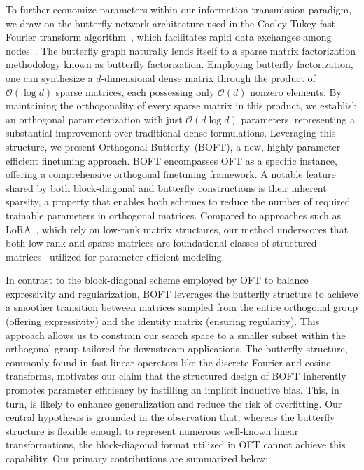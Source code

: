 To further economize parameters within our information transmission paradigm, we draw on the butterfly network architecture used in the Cooley-Tukey fast Fourier transform algorithm~\cite{cooley1965algorithm}, which facilitates rapid data exchanges among nodes~\cite{klasing1994broadcasting}. The butterfly graph naturally lends itself to a sparse matrix factorization methodology known as butterfly factorization. Employing butterfly factorization, one can synthesize a $d$-dimensional dense matrix through the product of $\mathcal{O}(\log d)$ sparse matrices, each possessing only $\mathcal{O}(d)$ nonzero elements. By maintaining the orthogonality of every sparse matrix in this product, we establish an orthogonal parameterization with just $\mathcal{O}(d\log d)$ parameters, representing a substantial improvement over traditional dense formulations. Leveraging this structure, we present Orthogonal Butterfly~(BOFT), a new, highly parameter-efficient finetuning approach. BOFT encompasses OFT as a specific instance, offering a comprehensive orthogonal finetuning framework. A notable feature shared by both block-diagonal and butterfly constructions is their inherent sparsity, a property that enables both schemes to reduce the number of required trainable parameters in orthogonal matrices. Compared to approaches such as LoRA~\cite{hulora2022}, which rely on low-rank matrix structures, our method underscores that both low-rank and sparse matrices are foundational classes of structured matrices~\cite{candes2011robust} utilized for parameter-efficient modeling.

In contrast to the block-diagonal scheme employed by OFT to balance expressivity and regularization, BOFT leverages the butterfly structure to achieve a smoother transition between matrices sampled from the entire orthogonal group (offering expressivity) and the identity matrix (ensuring regularity). This approach allows us to constrain our search space to a smaller subset within the orthogonal group tailored for downstream applications. The butterfly structure, commonly found in fast linear operators like the discrete Fourier and cosine transforms, motivates our claim that the structured design of BOFT inherently promotes parameter efficiency by instilling an implicit inductive bias. This, in turn, is likely to enhance generalization and reduce the risk of overfitting. Our central hypothesis is grounded in the observation that, whereas the butterfly structure is flexible enough to represent numerous well-known linear transformations, the block-diagonal format utilized in OFT cannot achieve this capability. Our primary contributions are summarized below:

